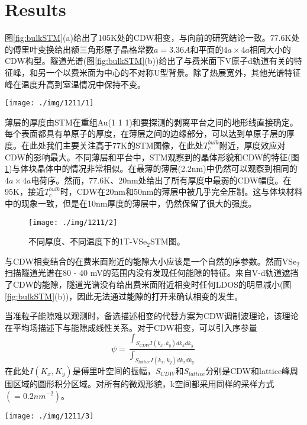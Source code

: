 \documentclass[reprint, aps, prb, showkeys]{revtex4-2}
\begin{document}
\section{Results}
图\ref{fig:bulkSTM}(a)给出了105K处的CDW相变，与向前的研究结论一致。77.6K处的傅里叶变换给出额三角形原子晶格常数$a = 3.36 A$和平面的$4a \times 4a$相同大小的CDW构型。隧道光谱(图\ref{fig:bulkSTM}(b))给出了与费米面下V原子d轨道有关的特征峰，和另一个以费米面为中心的不对称U型背景。除了热展宽外，其他光谱特征峰在温度升高到室温情况中保持不变。
\begin{figure*}[t]
    \texttt{[image: ./img/1211/1]}
    \caption{\label{fig:bulkSTM} 
    体块1T-VSe$_2$的晶格结构。(a)电阻随温度的变化关系，在105K附近出现CDW相变。(b)77.6K处测量的隧道电导率。(c)77.6K处$10 \times 10 nm^2$的STM图像。(d)对应的傅里叶变换，红色和绿色分别代表一阶原子晶格和CDW构型的峰。
    }
\end{figure*}

薄层的厚度由STM在重组Au(1 1 1)和要探测的剥离平台之间的地形线直接确定。每个表面都具有单原子的厚度，在薄层之间的边缘部分，可以达到单原子层的厚度。在此处我们主要关注高于77K的STM图像，在此处$T_c^{bulk}$附近，厚度效应对CDW的影响最大。不同薄层和平台中，STM观察到的晶体形貌和CDW的特征(图\ref{fig:flakeSTM})与体块晶体中的情况非常相似。在最薄的薄层(2.2nm)中仍然可以观察到相同的$4a \times 4a$电荷序。然而，77.6K、20nm处给出了所有厚度中最弱的CDW幅度。在95K，接近$T_c^{bulk}$时，CDW在20nm和50nm的薄层中被几乎完全压制。这与体块材料中的现象一致，但是在10nm厚度的薄层中，仍然保留了很大的强度。
\begin{figure}[b]
    \texttt{[image: ./img/1211/2]}
    \caption{\label{fig:flakeSTM} 
    不同厚度、不同温度下的1T-VSe$_2$STM图。
    }
\end{figure}

与CDW相变结合的在费米面附近的能隙大小应该是一个自然的序参数。然而VSe$_2$扫描隧道光谱在80 - 40 mV的范围内没有发现任何能隙的特征。来自V-d轨道遮挡了CDW的能隙，隧道光谱没有给出费米面附近相变时任何LDOS的明显减小(图\ref{fig:bulkSTM}(b))，因此无法通过能隙的打开来确认相变的发生。

当准粒子能隙难以观测时，备选描述相变的代替方案为CDW调制波理论，该理论在平均场描述下与能隙成线性关系。对于CDW相变，可以引入序参量
\begin{equation}
    \psi = \frac{\int_{S_{CDW}I(k_x, k_y) dk_x dk_y}}{\int_{S_{lattice}I(k_x, k_y) dk_x dk_y}}
    \label{eqn:orderParameter}
\end{equation}
在此处$I(K_x, K_y)$是傅里叶空间的振幅，$S_{CDW}$和$S_{lattice}$分别是CDW和lattice峰周围区域的圆形积分区域。对所有的微观形貌，k空间都采用同样的采样方式$( = 0.2 nm^{-2})$。
\begin{figure*}[t]
    \texttt{[image: ./img/1211/3]}
    \caption{\label{fig:orderParameter} 
    CDW序参量$\psi$对温度与薄层厚度的依赖关系。(a)相变附近体块单晶情况下，$\psi$与温度的依赖关系。实线为BCS近似给出的关系；(b)$\psi$在三种不同厚度条件下与温度的依赖关系；(c)在77.6K时$\psi$与厚度的依赖关系；(d)从3D到2D跨界情况下的三维表示。
    }
\end{figure*}
\end{document}
